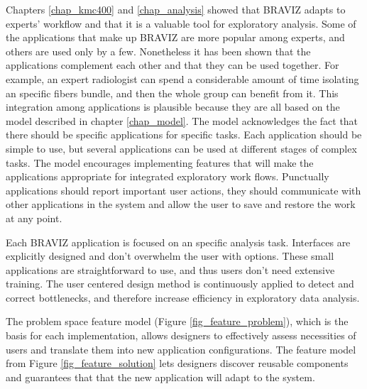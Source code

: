 {Chapters \ref{chap_kmc400} and \ref{chap_analysis} showed that BRAVIZ adapts to experts' workflow and that it is a valuable tool for exploratory analysis. Some of the applications that make up BRAVIZ are more popular among experts, and others are used only by a few. Nonetheless it has been shown that the applications complement each other and that they can be used together. For example, an expert radiologist can spend a considerable amount of time isolating an specific fibers bundle, and then the whole group can benefit from it.
This integration among applications is plausible because they are all based on the model described in chapter \ref{chap_model}. The model acknowledges the fact that there should be specific applications for specific tasks. Each application should be simple to use, but several applications can be used at different stages of complex tasks. The model encourages implementing features that will make the applications appropriate for integrated exploratory work flows. Punctually applications should report important user actions, they should communicate with other applications in the system and allow the user to save and restore the work at any point. 

Each BRAVIZ application is focused on an specific analysis task. Interfaces are explicitly designed and don't overwhelm the user with options. These small applications are straightforward to use, and thus users don't need extensive training. The user centered design method is continuously applied to detect and correct bottlenecks, and therefore increase efficiency in exploratory data analysis. 

The problem space feature model (Figure \ref{fig_feature_problem}), which is the basis for each implementation, allows designers to effectively assess necessities of users and translate them into new application configurations. The feature model from Figure \ref{fig_feature_solution} lets designers discover reusable components and guarantees that that the new application will adapt to the  system. 

}
